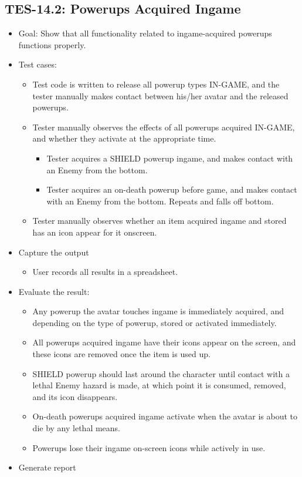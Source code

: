 \subsection{TES-14.2: Powerups Acquired Ingame}
\begin{itemize}
\item Goal: Show that all functionality related to ingame-acquired powerups functions properly.
\item Test cases: 

\begin{itemize}
\item Test code is written to release all powerup types IN-GAME, and the tester manually makes contact between his/her avatar and
the released powerups.
\item Tester manually observes the effects of all powerups acquired IN-GAME, and whether they activate at the appropriate time.
\begin{itemize}
\item Tester acquires a SHIELD powerup ingame, and makes contact with an Enemy from the bottom.
\item Tester acquires an on-death powerup before game, and makes contact with an Enemy from the bottom. Repeats and falls off bottom.
\end{itemize}
\item Tester manually observes whether an item acquired ingame and stored has an icon appear for it onscreen.
\end{itemize}
\item Capture the output 
\begin{itemize}
\item User records all results in a spreadsheet.
\end{itemize}
\item Evaluate the result: 

\begin{itemize}
\item Any powerup the avatar touches ingame is immediately acquired, and depending on the type of powerup, stored or activated immediately.
\item All powerups acquired ingame have their icons appear on the screen, and these icons are removed once the item is used up.
\item SHIELD powerup should last around the character until contact with a lethal Enemy hazard is made, at which point it is consumed, removed, and its icon disappears.
\item On-death powerups acquired ingame activate when the avatar is about to die by any lethal means.
\item Powerups lose their ingame on-screen icons while actively in use.

\end{itemize}
\item Generate report 
\end{itemize}


